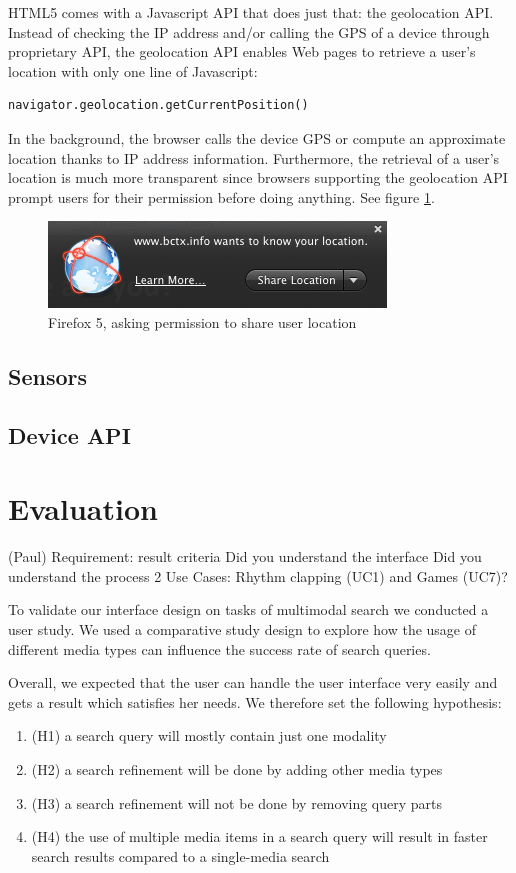 \documentclass[runningheads,a4paper]{llncs} \usepackage[utf8]{inputenc}
\begin{document}
HTML5 comes with a Javascript API that does just that: the geolocation API. Instead of checking the IP address and/or calling the GPS of a device through proprietary API, the geolocation API enables Web pages to retrieve a user's location with only one line of Javascript: 
\begin{lstlisting}
navigator.geolocation.getCurrentPosition()
\end{lstlisting}
In the background, the browser calls the device GPS or compute an approximate location thanks to IP address information. Furthermore, the retrieval of a user's location is much more transparent since browsers supporting the geolocation API prompt users for their permission before doing anything. See figure \ref{fig:geolocation-prompt}.

\begin{figure}[h!]
  \centering
    \includegraphics[width=0.3\linewidth]{resources/geolocation-prompt.png}
  \caption{Firefox 5, asking permission to share user location}
  \label{fig:geolocation-prompt}
\end{figure}


\subsection{Sensors}

\subsection{Device API}

\section{Evaluation}
(Paul)
Requirement: result criteria
Did you understand the interface
Did you understand the process
2 Use Cases: Rhythm clapping (UC1) and Games (UC7)?

To validate our interface design on tasks of multimodal search we conducted a user study. 
We used a comparative study design to explore how the usage of different media types can 
influence the success rate of search queries. 

Overall, we expected that the user can handle the user interface very easily and gets a 
result which satisfies her needs. We therefore set the following hypothesis: 
\begin{enumerate}
  \item (H1) a search query will mostly contain just one modality
  \item (H2) a search refinement will be done by adding other media types
  \item (H3) a search refinement will not be done by removing query parts
  \item (H4) the use of multiple media items in a search query will result
  in faster search results compared to a single-media search
\end{enumerate}
\end{document}
